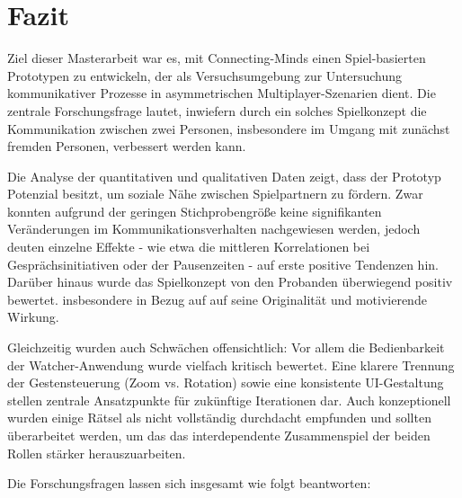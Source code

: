 \chapter{Fazit}
Ziel dieser Masterarbeit war es, mit Connecting-Minds einen Spiel-basierten Prototypen zu entwickeln, der als Versuchsumgebung zur Untersuchung kommunikativer Prozesse in asymmetrischen Multiplayer-Szenarien dient. Die zentrale Forschungsfrage lautet, inwiefern durch ein solches Spielkonzept die Kommunikation zwischen zwei Personen, insbesondere im Umgang mit zunächst fremden Personen, verbessert werden kann.

Die Analyse der quantitativen und qualitativen Daten zeigt, dass der Prototyp Potenzial besitzt, um soziale Nähe zwischen Spielpartnern zu fördern. Zwar konnten aufgrund der geringen Stichprobengröße keine signifikanten Veränderungen im Kommunikationsverhalten nachgewiesen werden, jedoch deuten einzelne Effekte - wie etwa die mittleren Korrelationen bei Gesprächsinitiativen oder der Pausenzeiten - auf erste positive Tendenzen hin. Darüber hinaus wurde das Spielkonzept von den Probanden überwiegend positiv bewertet. insbesondere in Bezug auf auf seine Originalität und motivierende Wirkung.

Gleichzeitig wurden auch Schwächen offensichtlich: Vor allem die Bedienbarkeit der Watcher-Anwendung wurde vielfach kritisch bewertet. Eine klarere Trennung der Gestensteuerung (Zoom vs. Rotation) sowie eine konsistente UI-Gestaltung stellen zentrale Ansatzpunkte für zukünftige Iterationen dar. Auch konzeptionell wurden einige Rätsel als nicht vollständig durchdacht empfunden und sollten überarbeitet werden, um das das interdependente Zusammenspiel der beiden Rollen stärker herauszuarbeiten.

Die Forschungsfragen lassen sich insgesamt wie folgt beantworten:

